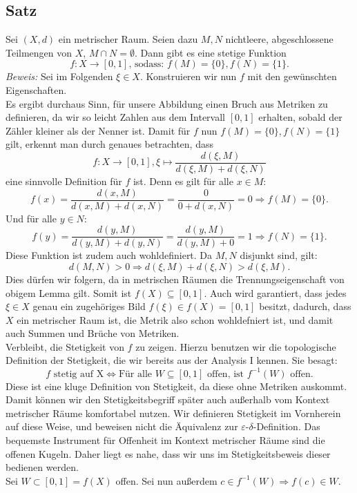 \documentclass[11pt,leqno]{article}
\begin{document}
\subsection{Satz}
Sei $(X,d)$ ein metrischer Raum.
Seien dazu $M, N$ nichtleere, abgeschlossene Teilmengen von $X$, $M \cap N = \emptyset $. Dann gibt es eine stetige Funktion
\[f: X \rightarrow{} [0,1] \text{, sodass: } f(M)=\{0\}, f(N)=\{1\}.\]
\textit{Beweis:}
Sei im Folgenden $\xi \in X$. Konstruieren wir nun $f$ mit den gewünschten Eigenschaften.\\
Es ergibt durchaus Sinn, für unsere Abbildung einen Bruch aus Metriken zu definieren, da wir so leicht Zahlen aus dem Intervall $[0,1]$ erhalten,
sobald der Zähler kleiner als der Nenner ist. Damit für $f$ nun $f(M)=\{0\}, f(N)=\{1\}$ gilt, erkennt man durch genaues betrachten, dass
\[f: X \xrightarrow{} [0,1], \xi \mapsto \frac{d(\xi,M)}{d(\xi,M)+d(\xi,N)} \]
eine sinnvolle Definition für $f$ ist.
Denn es gilt für alle $x \in M$:
\[ f(x)= \frac{d(x,M)}{d(x,M)+d(x,N)}=\frac{0}{0+d(x,N)}=0 \Rightarrow f(M)=\{0\}.\]
Und für alle $y \in N$: 
\[ f(y)= \frac{d(y,M)}{d(y,M)+d(y,N)}=\frac{d(y,M)}{d(y,M)+0}= 1 \Rightarrow f(N)=\{1\}.\]
Diese Funktion ist zudem auch wohldefiniert. Da $M,N$ disjunkt sind, gilt: 
\[d(M,N) > 0 \Rightarrow d(\xi,M) + d(\xi,N) > d(\xi,M).\]
Dies dürfen wir folgern, da in metrischen Räumen die Trennungseigenschaft von obigem Lemma gilt.
Somit ist $f(X) \subseteq [0,1]$.
Auch wird garantiert, dass jedes $\xi \in X$ genau ein zugehöriges Bild $f(\xi) \in f(X)=[0,1]$ besitzt, dadurch, dass $X$ ein 
metrischer Raum ist, die Metrik also schon wohldefniert ist, und damit auch Summen und Brüche von Metriken.\\
Verbleibt, die Stetigkeit von $f$ zu zeigen. Hierzu benutzen wir die topologische Definition der Stetigkeit, die wir bereits aus der Analysis I
kennen. Sie besagt:
\[f \text{ stetig auf X} \Leftrightarrow \text{Für alle } W \subseteq [0,1] \text{ offen, ist } f^{-1}(W) \text{ offen.}\]
Diese ist eine kluge Definition von Stetigkeit, da diese ohne Metriken auskommt. Damit können wir den Stetigkeitsbegriff später auch außerhalb vom 
Kontext metrischer Räume komfortabel nutzen. Wir definieren Stetigkeit im Vornherein auf diese Weise, und beweisen nicht die Äquivalenz zur 
$\varepsilon$-$\delta$-Definition.
Das bequemste Instrument für Offenheit im Kontext metrischer Räume sind die offenen Kugeln. Daher liegt es nahe,
dass wir uns im Stetigkeitsbeweis dieser bedienen werden. \\
Sei $W \subset [0,1]=f(X)$ offen. Sei nun außerdem $c \in f^{-1}(W) \Rightarrow f(c) \in W$. 
\end{document}
